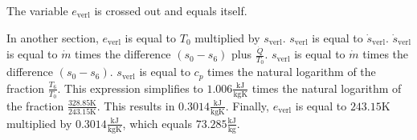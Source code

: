 The variable \( e_{\text{verl}} \) is crossed out and equals itself.

In another section, \( e_{\text{verl}} \) is equal to \( T_0 \) multiplied by \( s_{\text{verl}} \).
\( s_{\text{verl}} \) is equal to \( \dot{s}_{\text{verl}} \).
\( \dot{s}_{\text{verl}} \) is equal to \( \dot{m} \) times the difference \( (s_0 - s_6) \) plus \( \frac{\dot{Q}}{T_0} \).
\( s_{\text{verl}} \) is equal to \( \dot{m} \) times the difference \( (s_0 - s_6) \).
\( s_{\text{verl}} \) is equal to \( c_p \) times the natural logarithm of the fraction \( \frac{T_6}{T_0} \).
This expression simplifies to \( 1.006 \frac{\text{kJ}}{\text{kgK}} \) times the natural logarithm of the fraction \( \frac{328.85 \text{K}}{243.15 \text{K}} \).
This results in \( 0.3014 \frac{\text{kJ}}{\text{kgK}} \).
Finally, \( e_{\text{verl}} \) is equal to \( 243.15 \text{K} \) multiplied by \( 0.3014 \frac{\text{kJ}}{\text{kgK}} \), which equals \( 73.285 \frac{\text{kJ}}{\text{kg}} \).